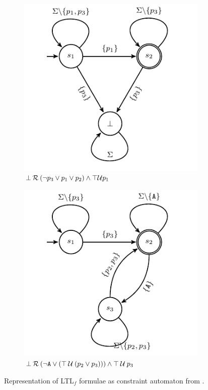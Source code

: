 \begin{figure}
	\centering
	\begin{subfigure}[b]{0.45\textwidth}
		\centering
		\includegraphics[width=\textwidth]{images/example_1_graph}
		\caption{$\bot\mathbin{\mathcal{R}}(\neg p_3\vee p_1\vee p_2) \wedge \top\mathcal{U}p_1$}
		\label{fig:g1}
	\end{subfigure}
	\hfill
	\begin{subfigure}[b]{0.45\textwidth}
		\centering
		\includegraphics[width=\textwidth]{images/example_2_graph}
		\caption{$\bot\mathbin{\mathcal{R}}(\neg\texttt{A}\vee(\top\mathbin{\mathcal{U}}(p_2\vee p_3)))\wedge\top\mathbin{\mathcal{U}} p_3$}
		\label{fig:g2}
	\end{subfigure}
	\caption{Representation of LTL$_f$ formulae as constraint automaton from \cite{LeoniMA12,Westergaard11}.}
	\label{fig:g1g2}
\end{figure}


